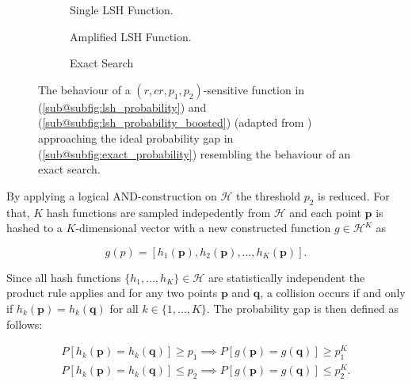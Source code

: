 \documentclass[../../../main.tex]{subfiles}
\begin{document}
\begin{figure}
    \centering
    \begin{subfigure}[b]{0.3\textwidth}
        \centering
        
        \caption{Single LSH Function.}
        \label{subfig:lsh_probability}
    \end{subfigure}
    \hfill
    \begin{subfigure}[b]{0.3\textwidth}
        \centering
        
        \caption{Amplified LSH Function.}
        \label{subfig:lsh_probability_boosted}
        \end{subfigure}
        \hfill
        \begin{subfigure}[b]{0.3\textwidth}
            \centering
            
            \caption{Exact Search}
            \label{subfig:exact_probability}
    \end{subfigure}
    \caption{The behaviour of a $(r, cr, p_1, p_2)$-sensitive function in (\ref{sub@subfig:lsh_probability}) and (\ref{sub@subfig:lsh_probability_boosted}) (adapted from \cite[100]{leskovec_rajaraman_ullman_2014}) approaching the ideal probability gap in (\ref{sub@subfig:exact_probability}) resembling the behaviour of an exact search.}
    \label{fig:lsh_probability}
\end{figure}
   
By applying a logical AND-construction on $\mathcal{H}$ the threshold $p_2$ is reduced. For that, $K$ hash functions are sampled indepedently from $\mathcal{H}$ and each point $\bm{p}$ is hashed to a $K$-dimensional vector with a new constructed function $g \in \mathcal{H}^K$ as

\begin{equation}\label{eq:or_construction}
    g(p) = [h_1(\bm{p}), h_2(\bm{p}), \dots, h_K(\bm{p})].
\end{equation}

Since all hash functions $\{h_1, \dots, h_K\} \in \mathcal{H}$ are statistically independent the product rule applies and for any two points $\bm{p}$ and $\bm{q}$, a collision occurs if and only if $h_k(\bm{p})=h_k(\bm{q})$ for all $k \in \{1, \dots, K\}$. The probability gap is then defined as follows:

\begin{align*}
    P[h_k(\bm{p})=h_k(\bm{q})] \geq p_1 \implies P[g(\bm{p})=g(\bm{q})] \geq p_1^K \\
    P[h_k(\bm{p})=h_k(\bm{q})] \leq p_2 \implies P[g(\bm{p})=g(\bm{q})] \leq p_2^K.
\end{align*}
\end{document}
